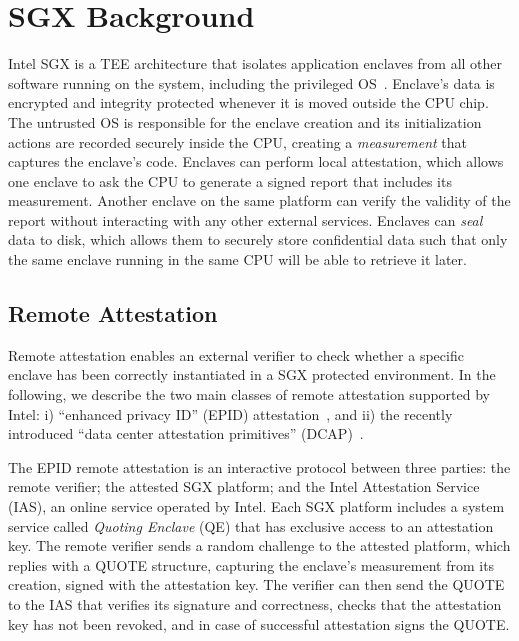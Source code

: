 \section{SGX Background}
\label{sec:background_proximitee}

Intel SGX is a TEE architecture that isolates application enclaves from all other software running on the system, including the privileged OS~\cite{sgxexplained}. Enclave's data is encrypted and integrity protected whenever it is moved outside the CPU chip. The untrusted OS is responsible for the enclave creation and its initialization actions are recorded securely inside the CPU, creating a \emph{measurement} that captures the enclave's code. Enclaves can perform local attestation, which allows one enclave to ask the CPU to generate a signed report that includes its measurement. Another enclave on the same platform can verify the validity of the report without interacting with any other external services. Enclaves can \emph{seal} data to disk, which  allows them to securely store confidential data such  that only the same enclave running in the same CPU will be able to retrieve it later.


\subsection{Remote Attestation}
\label{sec:background:attestation}

Remote attestation enables an external verifier to check whether a specific enclave has been correctly instantiated in a SGX protected environment. In the following, we describe the two main classes of remote attestation supported by Intel: i) ``enhanced privacy ID'' (EPID) attestation~\cite{epid_attestation}, and ii) the recently introduced ``data center attestation primitives'' (DCAP)~\cite{DCAP}.

The EPID remote attestation is an interactive protocol between three parties: the remote verifier; the attested SGX platform; and the Intel Attestation Service (IAS), an online service operated by Intel. 
Each SGX platform includes a system service called \emph{Quoting Enclave} (QE) that has exclusive access to an attestation key. The remote verifier sends a random challenge to the attested platform, which replies with a QUOTE structure, capturing the enclave's measurement from its creation, signed with the attestation key. The verifier can then send the QUOTE to the IAS that verifies its signature and correctness, checks that the attestation key has not been revoked, and in case of successful attestation signs the QUOTE. 

